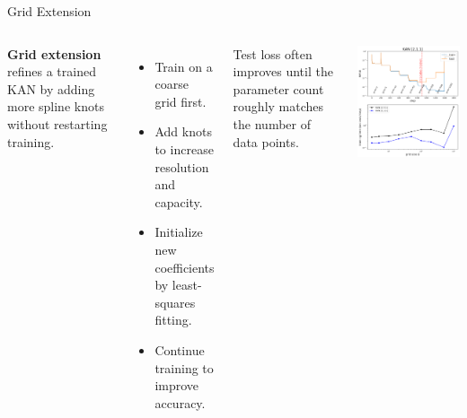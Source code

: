 \documentclass[aspectratio=169]{beamer}
\begin{document}

\begin{frame}{Grid Extension}
	\begin{columns}[T,onlytextwidth]
		
		\textbf{Grid extension} refines a trained KAN by adding more spline knots without restarting training.
		
		\begin{itemize}
			\item Train on a coarse grid first.
			\item Add knots to increase resolution and capacity.
			\item Initialize new coefficients by least-squares fitting.
			\item Continue training to improve accuracy.
		\end{itemize}
		
		Test loss often improves until the parameter count roughly matches the number of data points.
		
		\centering
		\includegraphics[width=\linewidth]{../images/grid_extension.png}
		
	\end{columns}
\end{frame}
\end{document}
